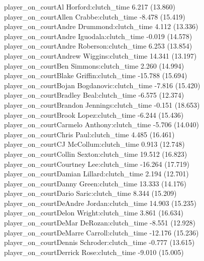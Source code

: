 \documentclass[
  landscape]{article}
\begin{document}
player\_on\_courtAl Horford:clutch\_time 6.217 (13.860)\\
player\_on\_courtAllen Crabbe:clutch\_time -8.478 (15.419)\\
player\_on\_courtAndre Drummond:clutch\_time 4.112 (13.336)\\
player\_on\_courtAndre Iguodala:clutch\_time -0.019 (14.578)\\
player\_on\_courtAndre Roberson:clutch\_time 6.253 (13.854)\\
player\_on\_courtAndrew Wiggins:clutch\_time 14.341 (13.197)\\
player\_on\_courtBen Simmons:clutch\_time 2.260 (14.994)\\
player\_on\_courtBlake Griffin:clutch\_time -15.788 (15.694)\\
player\_on\_courtBojan Bogdanovic:clutch\_time -7.816 (15.420)\\
player\_on\_courtBradley Beal:clutch\_time -6.575 (12.374)\\
player\_on\_courtBrandon Jennings:clutch\_time -0.151 (18.653)\\
player\_on\_courtBrook Lopez:clutch\_time -6.244 (15.436)\\
player\_on\_courtCarmelo Anthony:clutch\_time -5.706 (14.040)\\
player\_on\_courtChris Paul:clutch\_time 4.485 (16.461)\\
player\_on\_courtCJ McCollum:clutch\_time 0.913 (12.748)\\
player\_on\_courtCollin Sexton:clutch\_time 19.512 (16.823)\\
player\_on\_courtCourtney Lee:clutch\_time -16.264 (17.719)\\
player\_on\_courtDamian Lillard:clutch\_time 2.194 (12.701)\\
player\_on\_courtDanny Green:clutch\_time 13.333 (14.176)\\
player\_on\_courtDario Saric:clutch\_time 8.344 (15.209)\\
player\_on\_courtDeAndre Jordan:clutch\_time 14.903 (15.235)\\
player\_on\_courtDelon Wright:clutch\_time 3.861 (16.634)\\
player\_on\_courtDeMar DeRozan:clutch\_time -8.551 (12.928)\\
player\_on\_courtDeMarre Carroll:clutch\_time -12.176 (15.236)\\
player\_on\_courtDennis Schroder:clutch\_time -0.777 (13.615)\\
player\_on\_courtDerrick Rose:clutch\_time -9.010 (15.005)\\
\end{document}
